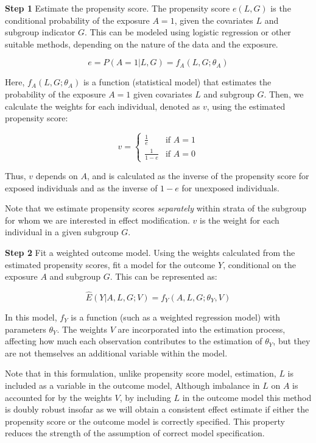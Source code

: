\documentclass[
  singlecolumn]{article}
\begin{document}
\textbf{Step 1} Estimate the propensity score. The propensity score
\(e(L, G)\) is the conditional probability of the exposure \(A = 1\),
given the covariates \(L\) and subgroup indicator \(G\). This can be
modeled using logistic regression or other suitable methods, depending
on the nature of the data and the exposure.

\[e = P(A = 1 | L, G) = f_A(L, G; \theta_A)\]

Here, \(f_A(L, G; \theta_A)\) is a function (statistical model) that
estimates the probability of the exposure \(A = 1\) given covariates
\(L\) and subgroup \(G\). Then, we calculate the weights for each
individual, denoted as \(v\), using the estimated propensity score:

\[
v = 
\begin{cases} 
\frac{1}{e} & \text{if } A = 1 \\
\frac{1}{1-e} & \text{if } A = 0 
\end{cases}
\]

Thus, \(v\) depends on \(A\), and is calculated as the inverse of the
propensity score for exposed individuals and as the inverse of \(1-e\)
for unexposed individuals.

Note that we estimate propensity scores \emph{separately} within strata
of the subgroup for whom we are interested in effect modification. \(v\)
is the weight for each individual in a given subgroup \(G\).

\textbf{Step 2} Fit a weighted outcome model. Using the weights
calculated from the estimated propensity scores, fit a model for the
outcome \(Y\), conditional on the exposure \(A\) and subgroup \(G\).
This can be represented as:

\[ \hat{E}(Y|A, L, G; V) = f_Y(A, L, G ; \theta_Y, V) \]

In this model, \(f_Y\) is a function (such as a weighted regression
model) with parameters \(θ_Y\). The weights \(V\) are incorporated into
the estimation process, affecting how much each observation contributes
to the estimation of \(θ_Y\), but they are not themselves an additional
variable within the model.

Note that in this formulation, unlike propensity score model,
estimation, \(L\) is included as a variable in the outcome model,
Although imbalance in \(L\) on \(A\) is accounted for by the weights
\(V\), by including \(L\) in the outcome model this method is doubly
robust insofar as we will obtain a consistent effect estimate if either
the propensity score or the outcome model is correctly specified. This
property reduces the strength of the assumption of correct model
specification.
\end{document}
